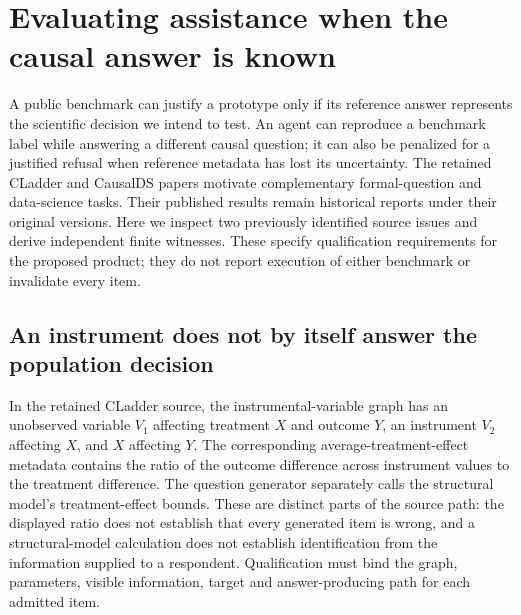 \section[Independent causal and scoring oracles]{Evaluating assistance when the causal answer is known}
\label{sec:exec25-bor}

A public benchmark can justify a prototype only if its reference answer represents the scientific decision we intend to test. An agent can reproduce a benchmark label while answering a different causal question; it can also be penalized for a justified refusal when reference metadata has lost its uncertainty. The retained CLadder and CausalDS papers motivate complementary formal-question and data-science tasks. Their published results remain historical reports under their original versions. Here we inspect two previously identified source issues and derive independent finite witnesses. These specify qualification requirements for the proposed product; they do not report execution of either benchmark or invalidate every item.~\citep{v12_la_2312_04350,v12_la_2607_08093,exec25_bor_sources,exec25_bor_reference}

\subsection{An instrument does not by itself answer the population decision}

In the retained CLadder source, the instrumental-variable graph has an unobserved variable $V_1$ affecting treatment $X$ and outcome $Y$, an instrument $V_2$ affecting $X$, and $X$ affecting $Y$. The corresponding average-treatment-effect metadata contains the ratio of the outcome difference across instrument values to the treatment difference. The question generator separately calls the structural model's treatment-effect bounds. These are distinct parts of the source path: the displayed ratio does not establish that every generated item is wrong, and a structural-model calculation does not establish identification from the information supplied to a respondent. Qualification must bind the graph, parameters, visible information, target and answer-producing path for each admitted item.~\citep{exec25_bor_sources}

